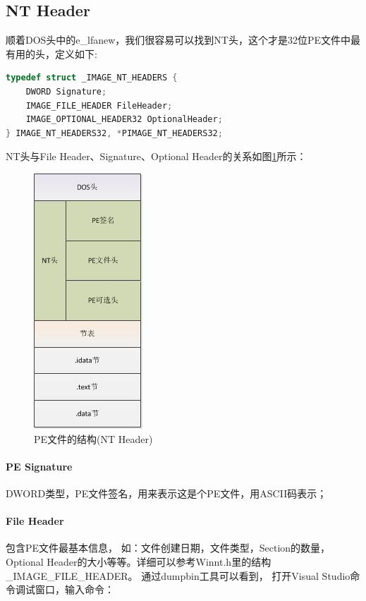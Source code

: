 \documentclass{book}
\begin{document}
\subsection{NT Header}

顺着DOS头中的e\_lfanew，我们很容易可以找到NT头，这个才是32位PE文件中最有用的头，定义如下:

\begin{lstlisting}[language=C]
typedef struct _IMAGE_NT_HEADERS {  
    DWORD Signature;  
    IMAGE_FILE_HEADER FileHeader;  
    IMAGE_OPTIONAL_HEADER32 OptionalHeader;  
} IMAGE_NT_HEADERS32, *PIMAGE_NT_HEADERS32; 
\end{lstlisting}

NT头与File Header、Signature、Optional  Header的关系如图\ref{fig:PEFileStructureWithNTHeader}所示：

\begin{figure}[htbp]
	\centering
	\includegraphics[scale=1]{PEFileStructureWithNTHeader.jpg}
	\caption{PE文件的结构(NT Header)}
	\label{fig:PEFileStructureWithNTHeader}
\end{figure}

\paragraph{PE Signature}DWORD类型，PE文件签名，用来表示这是个PE文件，用ASCII码表示；

\paragraph{File Header}包含PE文件最基本信息，
如：文件创建日期，文件类型，Section的数量，Optional Header的大小等等。详细可以参考Winnt.h里的结构\_IMAGE\_FILE\_HEADER。
通过dumpbin工具可以看到，
打开Visual Studio命令调试窗口，输入命令：
\end{document}
